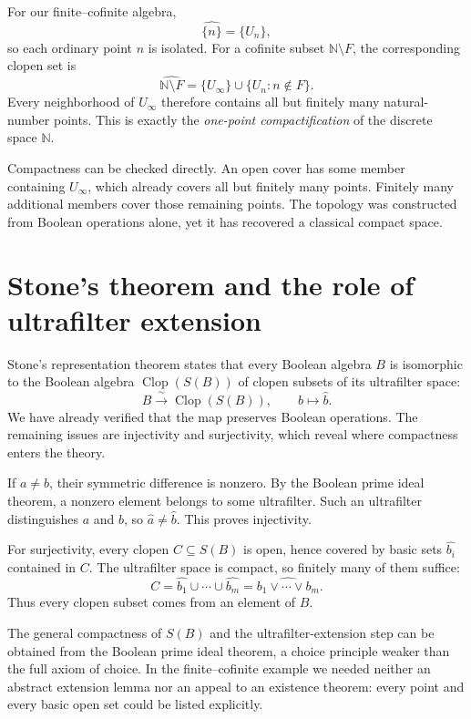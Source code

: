 For our finite--cofinite algebra,
\[
 \widehat{\{n\}}=\{U_n\},
\]
so each ordinary point \(n\) is isolated. For a cofinite subset \(\mathbb N\setminus F\), the corresponding clopen set is
\[
 \widehat{\mathbb N\setminus F}
 =\{U_\infty\}\cup\{U_n:n\notin F\}.
\]
Every neighborhood of \(U_\infty\) therefore contains all but finitely many natural-number points. This is exactly the \emph{one-point compactification} of the discrete space \(\mathbb N\).

Compactness can be checked directly. An open cover has some member containing \(U_\infty\), which already covers all but finitely many points. Finitely many additional members cover those remaining points. The topology was constructed from Boolean operations alone, yet it has recovered a classical compact space.

\section{Stone's theorem and the role of ultrafilter extension}

Stone's representation theorem states that every Boolean algebra \(B\) is isomorphic to the Boolean algebra \(\operatorname{Clop}(S(B))\) of clopen subsets of its ultrafilter space:
\[
 \boxed{B\xrightarrow{\ \sim\ }\operatorname{Clop}(S(B)),
 \qquad b\longmapsto\widehat b.}
\]
We have already verified that the map preserves Boolean operations. The remaining issues are injectivity and surjectivity, which reveal where compactness enters the theory.

If \(a\ne b\), their symmetric difference is nonzero. By the Boolean prime ideal theorem, a nonzero element belongs to some ultrafilter. Such an ultrafilter distinguishes \(a\) and \(b\), so \(\widehat a\ne\widehat b\). This proves injectivity.

For surjectivity, every clopen \(C\subseteq S(B)\) is open, hence covered by basic sets \(\widehat{b_i}\) contained in \(C\). The ultrafilter space is compact, so finitely many of them suffice:
\[
 C=\widehat{b_1}\cup\cdots\cup\widehat{b_m}
   =\widehat{b_1\vee\cdots\vee b_m}.
\]
Thus every clopen subset comes from an element of \(B\).

The general compactness of \(S(B)\) and the ultrafilter-extension step can be obtained from the Boolean prime ideal theorem, a choice principle weaker than the full axiom of choice. In the finite--cofinite example we needed neither an abstract extension lemma nor an appeal to an existence theorem: every point and every basic open set could be listed explicitly.


